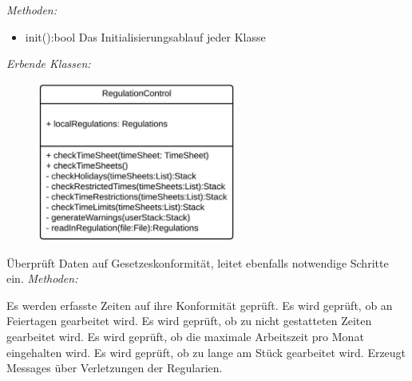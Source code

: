         \begin{itemize}
            \newline
                \emph{Methoden:}
                \begin{itemize}
                    \item{init():bool}
                        Das Initialisierungsablauf jeder Klasse
                \end{itemize}
                \emph{Erbende Klassen:}
                \begin{itemize}
                    \begin{figure}[htb]
                    \centering
                    \includegraphics[width=6.5cm]{Diagramms/class/singleclass/ControlReg.pdf}
                    \end{figure}
                    \newline
                       Überprüft Daten auf Gesetzeskonformität, leitet ebenfalls notwendige Schritte ein.
                                                          \newline
                    \emph{Methoden:}
                       \begin{itemize}
                            Es werden erfasste Zeiten auf ihre Konformität geprüft.
                            Es wird geprüft, ob an Feiertagen gearbeitet wird.
                            Es wird geprüft, ob zu nicht gestatteten Zeiten gearbeitet wird.
                            Es wird geprüft, ob die maximale Arbeitszeit pro Monat eingehalten wird.
                            Es wird geprüft, ob zu lange am Stück gearbeitet wird.
                            Erzeugt Messages über Verletzungen der Regularien.
                       \end{itemize}


\end{itemize}
\end{itemize}
